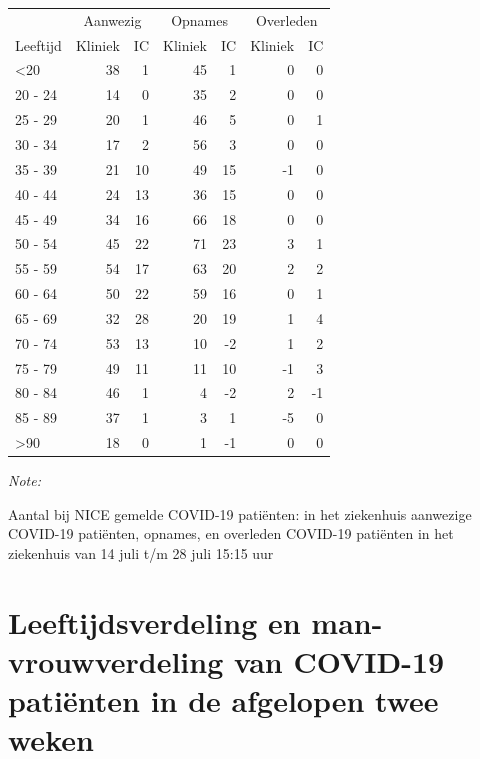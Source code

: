 \documentclass[
  english,
  man,floatsintext]{apa6}
\begin{document}
\begin{table}
\centering\begingroup\fontsize{10}{12}\selectfont

\begin{threeparttable}
\begin{tabular}{lrrrrrr}
\toprule
\multicolumn{1}{c}{ } & \multicolumn{2}{c}{Aanwezig} & \multicolumn{2}{c}{Opnames} & \multicolumn{2}{c}{Overleden} \\
\cmidrule(l{3pt}r{3pt}){2-3} \cmidrule(l{3pt}r{3pt}){4-5} \cmidrule(l{3pt}r{3pt}){6-7}
Leeftijd & Kliniek & IC & Kliniek & IC & Kliniek & IC\\
\midrule
<20 & 38 & 1 & 45 & 1 & 0 & 0\\
20 - 24 & 14 & 0 & 35 & 2 & 0 & 0\\
25 - 29 & 20 & 1 & 46 & 5 & 0 & 1\\
30 - 34 & 17 & 2 & 56 & 3 & 0 & 0\\
35 - 39 & 21 & 10 & 49 & 15 & -1 & 0\\
40 - 44 & 24 & 13 & 36 & 15 & 0 & 0\\
45 - 49 & 34 & 16 & 66 & 18 & 0 & 0\\
50 - 54 & 45 & 22 & 71 & 23 & 3 & 1\\
55 - 59 & 54 & 17 & 63 & 20 & 2 & 2\\
60 - 64 & 50 & 22 & 59 & 16 & 0 & 1\\
65 - 69 & 32 & 28 & 20 & 19 & 1 & 4\\
70 - 74 & 53 & 13 & 10 & -2 & 1 & 2\\
75 - 79 & 49 & 11 & 11 & 10 & -1 & 3\\
80 - 84 & 46 & 1 & 4 & -2 & 2 & -1\\
85 - 89 & 37 & 1 & 3 & 1 & -5 & 0\\
>90 & 18 & 0 & 1 & -1 & 0 & 0\\
\bottomrule
\end{tabular}
\begin{tablenotes}
\item \textit{Note: } 
\item Aantal bij NICE gemelde COVID-19 patiënten: in het ziekenhuis aanwezige COVID-19 patiënten, opnames, en overleden COVID-19 patiënten in het ziekenhuis van 14 juli t/m 28 juli 15:15 uur
\end{tablenotes}
\end{threeparttable}
\endgroup{}
\end{table}

\newpage

\hypertarget{leeftijdsverdeling-en-man-vrouwverdeling-van-covid-19-patiuxebnten-in-de-afgelopen-twee-weken}{%
\section{Leeftijdsverdeling en man-vrouwverdeling van COVID-19 patiënten in de afgelopen twee weken}\label{leeftijdsverdeling-en-man-vrouwverdeling-van-covid-19-patiuxebnten-in-de-afgelopen-twee-weken}}
\end{document}
